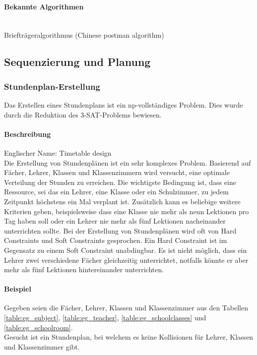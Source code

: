	\paragraph{Bekannte Algorithmen}\mbox{}\\
	Briefträgeralgorithmus (Chinese postman algorithm) \cite{pearson2004decision}

\subsection{Sequenzierung und Planung}\label{sequencing_scheduling}

	\subsubsection{Stundenplan-Erstellung}\label{tsp}
	Das Erstellen eines Stundenplans ist ein \gls{np}-vollständiges Problem. Dies wurde durch die Reduktion des 3-SAT-Problems bewiesen.

	\paragraph{Beschreibung}
	Englischer Name: Timetable design\\
	Die Erstellung von Stundenplänen ist ein sehr komplexes Problem. Basierend auf Fächer, Lehrer, Klassen und Klassenzimmern wird versucht, eine optimale Verteilung der Stunden zu 
	erreichen. Die wichtigste Bedingung ist, dass eine Ressource, sei das ein Lehrer, eine Klasse oder ein Schulzimmer, zu jedem Zeitpunkt höchstens ein Mal verplant ist. 
	Zusätzlich kann es beliebige weitere Kriterien geben, beispielsweise dass eine Klasse nie mehr als neun Lektionen pro Tag haben soll oder ein Lehrer nie mehr als 
	fünf Lektionen nacheinander unterrichten sollte. Bei der Erstellung von Stundenplänen wird oft von Hard Constraints und Soft Constraints gesprochen. Ein Hard Constraint ist im Gegensatz zu 
	einem Soft Constraint unabdingbar. Es ist nicht möglich, dass ein Lehrer zwei verschiedene Fächer gleichzeitig unterrichtet, notfalls könnte er aber mehr als fünf Lektionen hintereinander 
	unterrichten. \cite{Abramson92aparallel} \cite{Abramson91constructingschool} \cite{framework_timetabling} \cite{time_table_constraint_opti_ea}

	\paragraph{Beispiel} Gegeben seien die Fächer, Lehrer, Klassen und Klassenzimmer aus den Tabellen \ref{table:eg_subject}, \ref{table:eg_teacher}, \ref{table:eg_schoolclasses} und \ref{table:eg_schoolroom}.\\
Gesucht ist ein Stundenplan, bei welchem es keine Kollisionen für Lehrer, Klassen und Klassenzimmer gibt.

